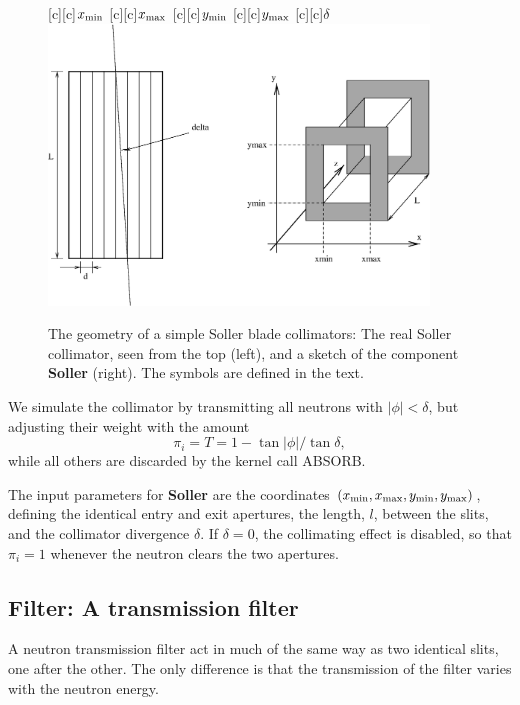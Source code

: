 \begin{figure}
  \begin{center}
    [c][c]{$x_{\rm min}$}
    [c][c]{$x_{\rm max}$}
    [c][c]{$y_{\rm min}$}
    [c][c]{$y_{\rm max}$}
    [c][c]{$\delta$}
    \includegraphics[width=0.9\textwidth]{figures/collimator.eps}
  \end{center}
\caption{The geometry of a simple Soller blade collimators:
The real Soller collimator, seen from the top (left), 
and a sketch of the component {\bf Soller} (right).
The symbols are defined in the text.}
\label{f:collimator}
\end{figure}

We simulate the collimator by transmitting all neutrons with
$|\phi| < \delta$, but adjusting their weight with the amount
\begin{equation}
\pi_i = T = 1-\tan|\phi|/ \tan\delta ,
\end{equation}
while all others are discarded by the kernel call ABSORB.

The input parameters for {\bf Soller} are the coordinates
$(x_{\rm min}, x_{\rm max}, y_{\rm min}, y_{\rm max})$,
defining the identical entry and exit apertures, 
the length, $l$, between the slits, 
and the collimator divergence $\delta$.
If $\delta=0$, the collimating effect is disabled,
so that $\pi_i = 1$ whenever the neutron clears the two apertures.

\subsection{Filter: A transmission filter}
A neutron transmission filter act in much of the same way as two
identical slits, one after the other.
The only difference is that the transmission of the filter
varies with the neutron energy.

